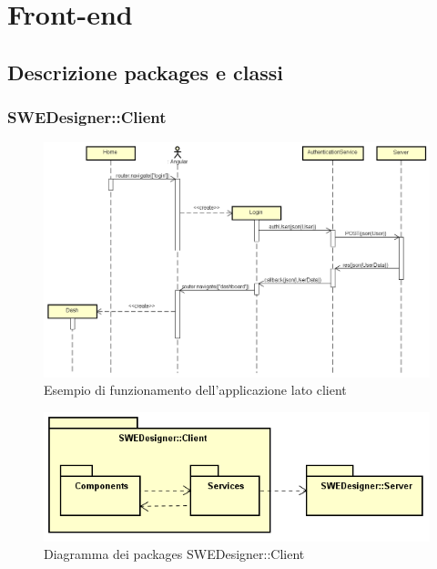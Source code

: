 \section{Front-end}

	\subsection{Descrizione packages e classi}

	\subsubsection{SWEDesigner::Client}
\begin{figure}
			\centering
			\includegraphics[scale=0.4]{Disegnetti/SequenceDiagram.png}
			\caption{Esempio di funzionamento dell'applicazione lato client}
		\end{figure}		
		\begin{figure}[h!]
			\centering
			\includegraphics[scale=0.8]{Disegnetti/Front-End.png}
			\caption{Diagramma dei packages SWEDesigner::Client}
 		\end{figure}
		

